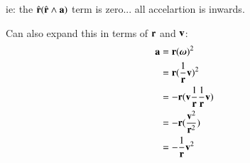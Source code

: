 \documentclass{article}      %
\begin{document}
ie: the $\hat{\mathbf{r}} (\hat{\mathbf{r}} \wedge \mathbf{a} )$ term is zero... all accelartion is inwards.

Can also expand this in terms of $\mathbf{r}$ and $\mathbf{v}$:
\begin{align*}
\mathbf{a} 
   &= \mathbf{r}(\boldsymbol{\omega})^2 \\
   &= \mathbf{r}(\frac{1}{\mathbf{r}}\mathbf{v})^2 \\
   &= -\mathbf{r}( \mathbf{v} \frac{1}{\mathbf{r}} \frac{1}{\mathbf{r}}\mathbf{v} ) \\
   &= -\mathbf{r}( \frac{\mathbf{v}^2}{\mathbf{r}^2}) \\
   &= -\frac{1}{\mathbf{r}}\mathbf{v}^2 \\
\end{align*}
\end{document}
